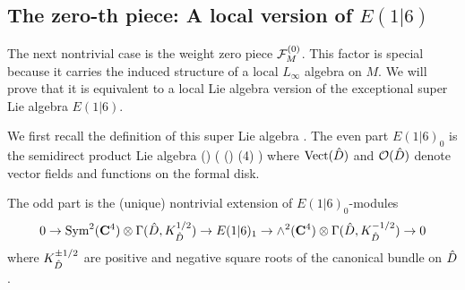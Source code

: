 \documentclass[../main.tex]{subfiles}
\begin{document}




\subsection{The zero-th piece: A local version of $E(1|6)$}
\parsec[] The next nontrivial case is the weight zero piece $\mathcal F^{(0)}_M$. 
This factor is special because it carries the induced structure of a local $L_\infty$ algebra on $M$. 
We will prove that it is equivalent to a local Lie algebra version of the exceptional super Lie algebra $E(1|6)$. 

We first recall the definition of this super Lie algebra \cite{KacBible}. 
The even part $E(1|6)_0$ is the semidirect product Lie algebra 
\beqn
\Vect() \ltimes \left( \cO() \otimes {}(4) \right )
\eeqn
where $\text{Vect}(\Hat{D})$ and $\mathcal O(\Hat{D})$ denote vector fields and functions on the formal disk.

The odd part is the (unique) nontrivial extension of $E(1|6)_0$-modules 
\[0\to \text{Sym}^2 (\mathbf{C}^4)\otimes \Gamma(\Hat{D}, K^{1/2}_{\Hat{D}}) \to E(1|6)_1 \to \wedge^2 (\mathbf{C}^4) \otimes \Gamma(\Hat{D}, K^{-1/2}_{\Hat{D}}) \to 0 
\]
where $K^{\pm 1/2}_{\Hat{D}}$ are positive and negative square roots of the canonical bundle on $\Hat{D}$.
\end{document}
